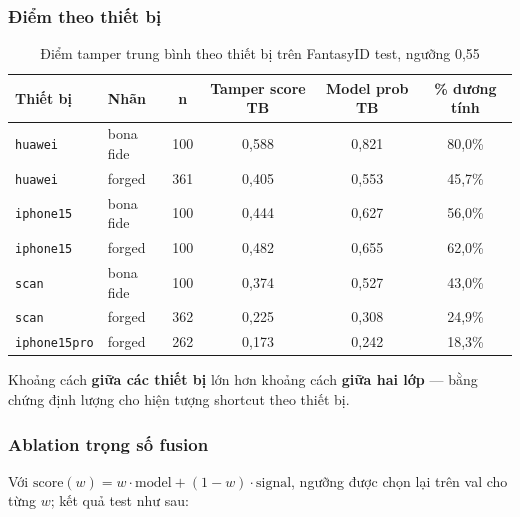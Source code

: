 \documentclass[12pt,a4paper]{article}
\begin{document}
\subsubsection{Điểm theo thiết bị}
\begin{table}[H]
  \centering
  \caption{Điểm tamper trung bình theo thiết bị trên FantasyID test, ngưỡng 0,55}
  \label{tab:tamper-device}
  \small
  \begin{tabular}{@{}llcccc@{}}
    \toprule
    \textbf{Thiết bị} & \textbf{Nhãn} & \textbf{n} & \textbf{Tamper score TB} & \textbf{Model prob TB} & \textbf{\% dương tính}\\
    \midrule
    \texttt{huawei} & bona fide & 100 & 0,588 & 0,821 & 80,0\%\\
    \texttt{huawei} & forged & 361 & 0,405 & 0,553 & 45,7\%\\
    \texttt{iphone15} & bona fide & 100 & 0,444 & 0,627 & 56,0\%\\
    \texttt{iphone15} & forged & 100 & 0,482 & 0,655 & 62,0\%\\
    \texttt{scan} & bona fide & 100 & 0,374 & 0,527 & 43,0\%\\
    \texttt{scan} & forged & 362 & 0,225 & 0,308 & 24,9\%\\
    \texttt{iphone15pro} & forged & 262 & 0,173 & 0,242 & 18,3\%\\
    \bottomrule
  \end{tabular}
\end{table}
Khoảng cách \textbf{giữa các thiết bị} lớn hơn khoảng cách \textbf{giữa hai lớp} --- bằng chứng định
lượng cho hiện tượng shortcut theo thiết bị.

\subsubsection{Ablation trọng số fusion}
Với $\text{score}(w) = w\cdot\text{model} + (1-w)\cdot\text{signal}$, ngưỡng được chọn lại trên val
cho từng $w$; kết quả test như sau:

\begin{table}[H]
  \centering
  \caption{Ablation trọng số fusion trên FantasyID}
  \label{tab:tamper-ablation}
  \footnotesize
\end{table}
\end{document}
